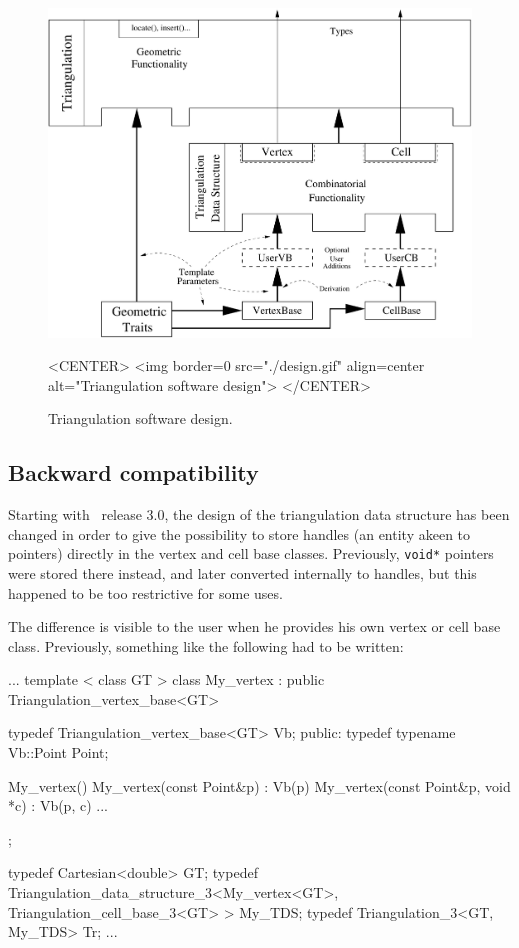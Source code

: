 \begin{figure}[htbp]
\begin{ccTexOnly}
\begin{center}
\includegraphics[width=13cm]{Triangulation_3/design}
\end{center}
\end{ccTexOnly}
\begin{ccHtmlOnly}
<CENTER>
<img border=0 src="./design.gif" align=center
 alt="Triangulation software design">
</CENTER>
\end{ccHtmlOnly}
\caption{Triangulation software design.
\label{T3-fig-layers}}
\end{figure}

\subsection{Backward compatibility}
\label{T3-sec-compat}

Starting with \cgal\ release 3.0, the design of the triangulation data
structure has been changed in order to give the possibility to store handles
(an entity akeen to pointers) directly in the vertex and cell base classes.
Previously, \texttt{void*} pointers were stored there instead, and later
converted internally to handles, but this happened to be too restrictive for
some uses.

The difference is visible to the user when he provides his own vertex or cell
base class.  Previously, something like the following had to be written:

\begin{ccExampleCode}
...
template < class GT >
class My_vertex
  : public Triangulation_vertex_base<GT>
{
  typedef Triangulation_vertex_base<GT>  Vb;
public:
  typedef typename Vb::Point             Point;

  My_vertex() {}
  My_vertex(const Point&p)          : Vb(p) {}
  My_vertex(const Point&p, void *c) : Vb(p, c) {}
...
};

typedef Cartesian<double>                                               GT;
typedef Triangulation_data_structure_3<My_vertex<GT>,
                                       Triangulation_cell_base_3<GT> >  My_TDS;
typedef Triangulation_3<GT, My_TDS>                                     Tr;
...
\end{ccExampleCode}

